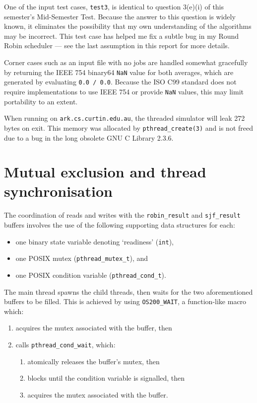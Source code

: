 \documentclass[a4paper,12pt,titlepage]{article}
\begin{document}
One of the input test cases, \texttt{test3}, is identical to question 3(e)(i)
of this semester's Mid-Semester Test. Because the answer to this question is
widely known, it eliminates the possibility that my own understanding of the
algorithms may be incorrect. This test case has helped me fix a subtle bug in
my Round Robin scheduler --- see the last assumption in this report for more
details.

Corner cases such as an input file with no jobs are handled somewhat gracefully
by returning the IEEE 754 binary64 \texttt{NaN} value for both averages, which
are generated by evaluating \texttt{0.0 / 0.0}. Because the ISO C99 standard
does not require implementations to use IEEE 754 or provide \texttt{NaN}
values, this may limit portability to an extent.

When running on \texttt{ark.cs.curtin.edu.au}, the threaded simulator will leak
272 bytes on exit. This memory was allocated by \texttt{pthread\_create(3)} and
is not freed due to a bug in the long obsolete GNU C Library 2.3.6.

\newpage

\section{Mutual exclusion and thread synchronisation}

The coordination of reads and writes with the \texttt{robin\_result} and
\texttt{sjf\_result} buffers involves the use of the following supporting
data structures for each:

\begin{itemize}
	\item one binary state variable denoting `readiness' (\texttt{int}),
	\item one POSIX mutex (\texttt{pthread\_mutex\_t}), and
	\item one POSIX condition variable (\texttt{pthread\_cond\_t}).
\end{itemize}

The main thread spawns the child threads, then waits for the two
aforementioned buffers to be filled. This is achieved by using
\texttt{OS200\_WAIT}, a function-like macro which:

\begin{enumerate}
	\item acquires the mutex associated with the buffer, then
	\item calls \texttt{pthread\_cond\_wait}, which:
	\begin{enumerate}
		\item atomically releases the buffer's mutex, then
		\item blocks until the condition variable is signalled, then
		\item acquires the mutex associated with the buffer.
	\end{enumerate}
\end{enumerate}
\end{document}
